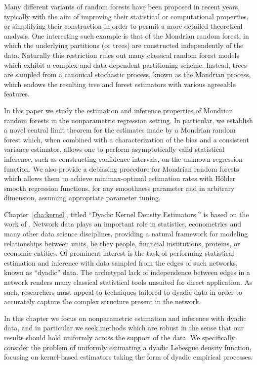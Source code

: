 Many different variants of random forests have been proposed in recent years,
typically with the aim of improving their statistical or computational
properties, or simplifying their construction in order to permit a more
detailed theoretical analysis.
One interesting such example is that of the Mondrian random forest, in which
the underlying partitions (or trees) are constructed independently of the data.
Naturally this restriction rules out many classical random forest models which
exhibit a complex and data-dependent partitioning scheme. Instead, trees are
sampled from a canonical stochastic process, known as the Mondrian process,
which endows the resulting tree and forest estimators with various agreeable
features.

In this paper we study the estimation and inference properties of Mondrian
random forests in the nonparametric regression setting. In particular, we
establish a novel central limit theorem for the estimates made by a Mondrian
random forest which, when combined with a characterization of the bias and a
consistent variance estimator, allows one to perform asymptotically valid
statistical inference, such as constructing confidence intervals, on the
unknown regression function. We also provide a debiasing procedure for Mondrian
random forests which allows them to achieve minimax-optimal estimation rates
with H{\"o}lder smooth regression functions, for any smoothness parameter and
in arbitrary dimension, assuming appropriate parameter tuning.

Chapter~\ref{cha:kernel}, titled ``Dyadic Kernel Density Estimators,'' is based
on the work of \cite{cattaneo2024uniform}.
Network data plays an important role in statistics, econometrics and many other
data science disciplines, providing a natural framework for modeling
relationships between units, be they people, financial institutions, proteins,
or economic entities. Of prominent interest is the task of performing
statistical estimation and inference with data sampled from the edges of such
networks, known as ``dyadic'' data. The archetypal lack of independence between
edges in a network renders many classical statistical tools unsuited for direct
application. As such, researchers must appeal to techniques tailored to dyadic
data in order to accurately capture the complex structure present in the
network.

In this chapter we focus on nonparametric estimation and inference with dyadic
data, and in particular we seek methods which are robust in the sense that our
results should hold uniformly across the support of the data. We specifically
consider the problem of uniformly estimating a dyadic Lebesgue density
function, focusing on kernel-based estimators taking the form of dyadic
empirical processes.

